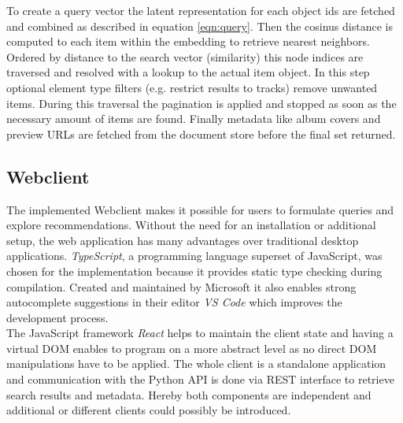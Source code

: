 \documentclass[sigconf]{acmart}
\begin{document}
To create a query vector the latent representation for each object ids are fetched and combined as described in equation \ref{eqn:query}. Then the cosinus distance is computed to each item within the embedding to retrieve nearest neighbors. Ordered by distance to the search vector (similarity) this node indices are traversed and resolved with a lookup to the actual item object. In this step optional element type filters (e.g. restrict results to tracks) remove unwanted items. During this traversal the pagination is applied and stopped as soon as the necessary amount of items are found. Finally metadata like album covers and preview URLs are fetched from the document store before the final set returned.



\subsection{Webclient}




The implemented Webclient makes it possible for users to formulate queries and explore recommendations. Without the need for an installation or additional setup, the web application has many advantages over traditional desktop applications. \emph{TypeScript}, a programming language superset of JavaScript, was chosen for the implementation because it provides static type checking during compilation. Created and maintained by Microsoft it also enables strong autocomplete suggestions in their editor \emph{VS Code} which improves the development process. \\
The JavaScript framework \emph{React} helps to maintain the client state and having a virtual DOM enables to program on a more abstract level as no direct DOM manipulations have to be applied. The whole client is a standalone application and communication with the Python API is done via REST interface to retrieve search results and metadata. Hereby both components are independent and additional or different clients could possibly be introduced. \\
\end{document}
